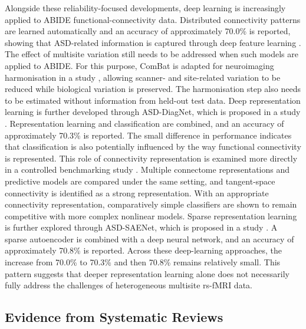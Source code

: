 Alongside these reliability-focused developments, deep learning is increasingly applied to ABIDE functional-connectivity data. Distributed connectivity patterns are learned automatically and an accuracy of approximately 70.0\% is reported, showing that ASD-related information is captured through deep feature learning \citep{Heinsfeldetal2018}. The effect of multisite variation still needs to be addressed when such models are applied to ABIDE. For this purpose, ComBat is adapted for neuroimaging harmonisation in a study \citep{Fortinetal2018}, allowing scanner- and site-related variation to be reduced while biological variation is preserved. The harmonisation step also needs to be estimated without information from held-out test data. Deep representation learning is further developed through ASD-DiagNet, which is proposed in a study \citep{Eslamietal2019}. Representation learning and classification are combined, and an accuracy of approximately 70.3\% is reported. The small difference in performance indicates that classification is also potentially influenced by the way functional connectivity is represented. This role of connectivity representation is examined more directly in a controlled benchmarking study \citep{Dadietal2019}. Multiple connectome representations and predictive models are compared under the same setting, and tangent-space connectivity is identified as a strong representation. With an appropriate connectivity representation, comparatively simple classifiers are shown to remain competitive with more complex nonlinear models. Sparse representation learning is further explored through ASD-SAENet, which is proposed in a study \citep{AlmuqhimSaeed2021}. A sparse autoencoder is combined with a deep neural network, and an accuracy of approximately 70.8\% is reported. Across these deep-learning approaches, the increase from 70.0\% to 70.3\% and then 70.8\% remains relatively small. This pattern suggests that deeper representation learning alone does not necessarily fully address the challenges of heterogeneous multisite rs-fMRI data.


\subsection{Evidence from Systematic Reviews}

